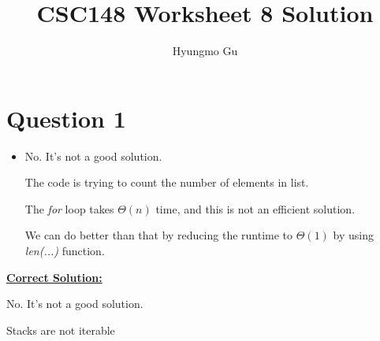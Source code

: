 \documentclass[12pt]{article}
\begin{document}
\title{CSC148 Worksheet 8 Solution}
\author{Hyungmo Gu}
\maketitle

\section*{Question 1}
\begin{itemize}
    \item
    No. It's not a good solution.

    \bigskip

    The code is trying to count the number of elements in list.

    \bigskip

    The \textit{for} loop takes $\Theta(n)$ time, and this is not an efficient solution.

    \bigskip

    We can do better than that by reducing the runtime to $\Theta(1)$ by using \textit{len(...)} function.
\end{itemize}

\bigskip

\begin{mdframed}
    \underline{\textbf{Correct Solution:}}

    \bigskip
    \color{red}
    No. It's not a good solution.

    \bigskip

    Stacks are not iterable
    \color{black}
\end{mdframed}
\end{document}
